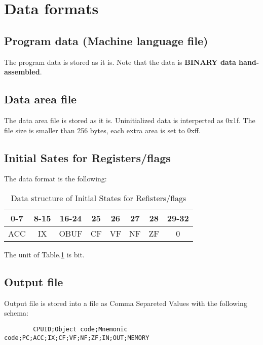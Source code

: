 \documentclass[a4paper]{article}
\begin{document}
    \section{Data formats}
        \subsection{Program data (Machine language file)}
        The program data is stored as it is. Note that the data is {\bf BINARY data hand-assembled}.
        
        \subsection{Data area file}
        The data area file is stored as it is. Uninitialized data is interperted as 0x1f. The file size is smaller than 256 bytes, each extra area is set to 0xff.
        
        \subsection{Initial Sates for Registers/flags}
        The data format is the following:
        
        \begin{table}[htb]
                \begin{center}
                    \caption{Data structure of Initial States for Refisters/flags \label{structure}}
                    \begin{tabular}{|c|c|c|c|c|c|c|c|}
                        \hline0-7&8-15&16-24&25&26&27&28&29-32\\
                        \hline ACC&IX&OBUF&CF&VF&NF&ZF&0\\
                        \hline
                    \end{tabular}
                \end{center}
        \end{table}
        
        The unit of Table.\ref{structure} is bit.
        
        \subsection{Output file}
        Output file is stored into a file as Comma Separeted Values with the following schema:
        \begin{verbatim}
        CPUID;Object code;Mnemonic code;PC;ACC;IX;CF;VF;NF;ZF;IN;OUT;MEMORY
        \end{verbatim}
\end{document}

